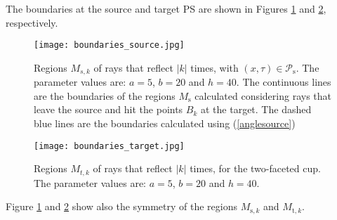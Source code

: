 %
The boundaries at the source and target PS are shown in Figures \ref{fig:boundary} and \ref{boundaries_target}, respectively. 
\begin{figure}[htbp]
\texttt{[image: boundaries\_source.jpg]}
\caption{\footnotesize{Regions $M_{s,k}$ of rays that reflect $|k|$ times, with $(x,\tau)\in\mathcal{P}_\textrm{s}$.
The parameter values are: $a=5$, $b=20$ and $h=40$. The continuous lines are the boundaries of the regions $M_{\textrm{s}}$
calculated considering rays that leave the source and hit the points $B_{k}$ at the target. The dashed blue lines are the boundaries calculated using (\ref{anglesource}) }}
\label{fig:boundary}
\end{figure}
\begin{figure}[htbp]
\texttt{[image: boundaries\_target.jpg]}
\caption{Regions $M_{t,k}$ of rays that reflect $|k|$ times, for the two-faceted cup. The parameter values are: $a=5$, $b=20$ and $h=40$.}
\label{boundaries_target}
\end{figure}
\noindent 
Figure \ref{fig:boundary} and \ref{boundaries_target} show also the symmetry of the regions $M_{\textrm{s},k}$ and $M_{\textrm{t},k}$. 
